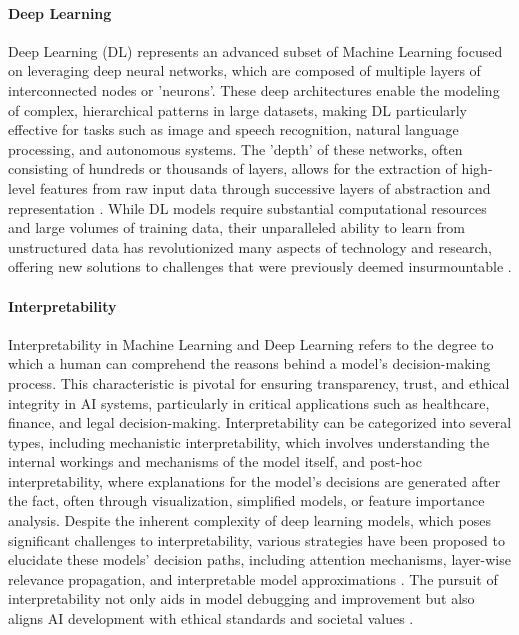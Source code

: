\documentclass{article}
\begin{document}
\paragraph{Deep Learning}
Deep Learning (DL) represents an advanced subset of Machine Learning focused on leveraging deep neural networks, which are composed of multiple layers of interconnected nodes or 'neurons'. These deep architectures enable the modeling of complex, hierarchical patterns in large datasets, making DL particularly effective for tasks such as image and speech recognition, natural language processing, and autonomous systems. The 'depth' of these networks, often consisting of hundreds or thousands of layers, allows for the extraction of high-level features from raw input data through successive layers of abstraction and representation \cite{LeCunBengioHinton2015}. While DL models require substantial computational resources and large volumes of training data, their unparalleled ability to learn from unstructured data has revolutionized many aspects of technology and research, offering new solutions to challenges that were previously deemed insurmountable \cite{GoodfellowBengioCourville2016}.

\paragraph{Interpretability}
Interpretability in Machine Learning and Deep Learning refers to the degree to which a human can comprehend the reasons behind a model's decision-making process. This characteristic is pivotal for ensuring transparency, trust, and ethical integrity in AI systems, particularly in critical applications such as healthcare, finance, and legal decision-making. Interpretability can be categorized into several types, including mechanistic interpretability, which involves understanding the internal workings and mechanisms of the model itself, and post-hoc interpretability, where explanations for the model's decisions are generated after the fact, often through visualization, simplified models, or feature importance analysis. Despite the inherent complexity of deep learning models, which poses significant challenges to interpretability, various strategies have been proposed to elucidate these models' decision paths, including attention mechanisms, layer-wise relevance propagation, and interpretable model approximations \cite{DoshiVelezKim2017}. The pursuit of interpretability not only aids in model debugging and improvement but also aligns AI development with ethical standards and societal values \cite{Rudin2019}.
\end{document}
